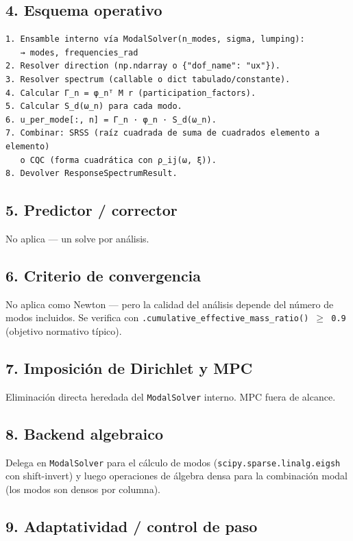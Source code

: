 \documentclass[11pt,letterpaper,oneside]{report}
\begin{document}
\subsection{4. Esquema operativo}

\begin{lstlisting}
1. Ensamble interno vía ModalSolver(n_modes, sigma, lumping):
   → modes, frequencies_rad
2. Resolver direction (np.ndarray o {"dof_name": "ux"}).
3. Resolver spectrum (callable o dict tabulado/constante).
4. Calcular Γ_n = φ_nᵀ M r (participation_factors).
5. Calcular S_d(ω_n) para cada modo.
6. u_per_mode[:, n] = Γ_n · φ_n · S_d(ω_n).
7. Combinar: SRSS (raíz cuadrada de suma de cuadrados elemento a elemento)
   o CQC (forma cuadrática con ρ_ij(ω, ξ)).
8. Devolver ResponseSpectrumResult.

\end{lstlisting}

\subsection{5. Predictor / corrector}

No aplica --- un solve por análisis.

\subsection{6. Criterio de convergencia}

No aplica como Newton --- pero la calidad del análisis depende del número de modos incluidos. Se verifica con
\texttt{.cumulative\_effective\_mass\_ratio() \ensuremath{\ge} 0.9} (objetivo normativo típico).

\subsection{7. Imposición de Dirichlet y MPC}

Eliminación directa heredada del \texttt{ModalSolver} interno. MPC fuera de alcance.

\subsection{8. Backend algebraico}

Delega en \texttt{ModalSolver} para el cálculo de modos (\texttt{scipy.sparse.linalg.eigsh} con shift-invert) y luego operaciones de álgebra densa para la combinación modal (los modos son densos por columna).

\subsection{9. Adaptatividad / control de paso}
\end{document}
